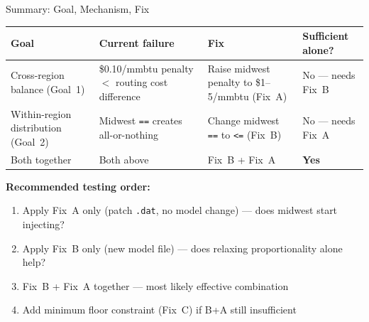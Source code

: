 \documentclass[aspectratio=169, 11pt]{beamer}
\begin{document}
\begin{frame}{Summary: Goal, Mechanism, Fix}
  \begin{table}
    \centering
    \small
    \begin{tabular}{p{3.5cm}p{3.5cm}p{3.5cm}p{2.5cm}}
      \toprule
      \textbf{Goal} & \textbf{Current failure} & \textbf{Fix} & \textbf{Sufficient alone?} \\
      \midrule
      Cross-region balance (Goal~1) & \$0.10/mmbtu penalty $<$ routing cost difference & Raise midwest penalty to \$1--5/mmbtu (Fix~A) & \alert{No --- needs Fix~B} \\[0.5em]
      Within-region distribution (Goal~2) & Midwest \texttt{==} creates all-or-nothing & Change midwest \texttt{==} to \texttt{<=} (Fix~B) & \alert{No --- needs Fix~A} \\[0.5em]
      Both together & Both above & Fix~B + Fix~A & \textcolor{okgreen}{\textbf{Yes}} \\
      \bottomrule
    \end{tabular}
  \end{table}

  \vspace{0.5em}
  \textbf{Recommended testing order:}
  \begin{enumerate}
    \item Apply Fix~A only (patch \texttt{.dat}, no model change) --- does midwest start injecting?
    \item Apply Fix~B only (new model file) --- does relaxing proportionality alone help?
    \item Fix~B + Fix~A together --- most likely effective combination
    \item Add minimum floor constraint (Fix~C) if B+A still insufficient
  \end{enumerate}
\end{frame}
\end{document}
